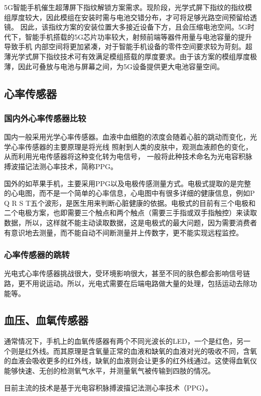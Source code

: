 \documentclass[a4paper,11pt,onecolumn,twoside]{article}
\begin{document}
\begin{multicols}{2}
5G智能手机催生超薄屏下指纹解锁方案需求。现阶段，光学式屏下指纹的指纹模组厚度较大，因此模组在安装时需与电池交错分布，才可将足够光路空间预留给透镜。 因此，该指纹方案的安装位置大多接近设备下方，且会压缩电池空间。5G时代下，智能手机搭载的5G芯片功率较大，射频前端等器件用量与电池容量的提升导致手机 内部空间将更加紧凑，对于智能手机设备的零件空间要求较为苛刻。超薄光学式屏下指纹技术可有效满足模组搭载的厚度要求。由于该方案的模组厚度极薄，因此可叠放与电池与屏幕之间，为5G设备提供更大电池容量空间。

\subsection{心率传感器}

\subsubsection{国内外心率传感器比较}

国内一般采用光学心率传感器。血液中血细胞的浓度会随着心脏的跳动而变化，光学心率传感器的主要原理是将光线 照射到人类的皮肤中，观测血液颜色的变化，从而利用光电传感器将这种变化转为电信号， 一般将此种技术命名为光电容积脉搏波描记法测心率技术，简称PPG。

国外的如苹果手机，主要采用PPG以及电极传感测量方式。电极式提取的是完整的心电图，而不是一个简单的心率信息，心电图中有很多详细的健康信息，例如P Q R S T五个波形，是医生用来判断心脏健康的依据。\cite{Heart}电极式的目前有三个电极和二个电极方案，也即需要三个触点和两个触点（需要三手指或双手指触控）来读取数据，所以，这样就不能主动读取数据，这是电极式的最大问题，因为需要消费者有意识地去测量，而不能自动不间断测量并上传数字，更不能实现远程监控。

\subsubsection{心率传感器的跳转}

光电式心率传感器挑战很大，受环境影响很大，甚至不同的肤色都会影响信号链路，更不用说运动。所以，光电式需要在后端电路做大量的处理，包括运动去除功能等。

\subsection{血压、血氧传感器}

通常情况下，手机上的血氧传感器有两个不同光波长的LED，一个是红色，另一个则是红外线。而其原理是含氧量正常的血液和缺氧的血液对光的吸收不同，含氧的血液会吸收更多的红外线，缺氧的血液则会让更多的红外线通过。这使得血氧仪能够快速、无创的检测氧气水平\cite{BloodO2}，并测量氧气被传输到四肢的情况。

目前主流的技术是基于光电容积脉搏波描记法测心率技术（PPG）。






\end{multicols}

\clearpage
\end{document}
